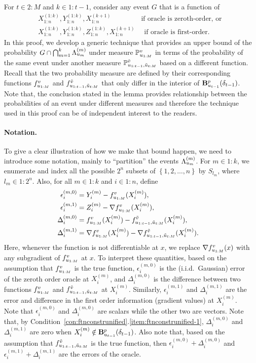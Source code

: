 For $t \in 2:M$ and $k \in 1:t-1$, consider any event $G$ that is a function of 
\begin{align*}
	&X_{1:n}^{(1:k)}, Y_{1:n}^{(1:k)}, X_{1:n}^{(k+1)} 
	\quad\quad\quad\quad \text{ if oracle is zeroth-order, or }\\
	&X_{1:n}^{(1:k)}, Y_{1:n}^{(1:k)}, Z_{1:n}^{(1:k)}, X_{1:n}^{(k+1)} 
	\quad \text{ if oracle is first-order.}
\end{align*}
In this proof, we develop a generic technique that provides an upper bound of the probability 
$G \cap \bigcap_{m=1}^{k} \Lambda_{u_{m}}^{({m})}$ under measure $\mathbb{P}_{u_{1:M}}^v$ in terms of 
the probability of the same event under another measure $\mathbb{P}_{u_{1:t-1}, \tilde u_{t:M}}^{\tilde v}$ based on a different function.
Recall that the two probability 
measure are defined by their corresponding functions $f_{u_{1:M}}^v$ and $f_{u_{1:t-1}, \tilde u_{t:M}}^{\tilde v}$ that only differ
in the interior of $\mathbf{B}^p_{u_{t-1}}({\delta_{t-1}})$.
Note that, the conclusion stated in the lemma provides relationship between the probabilities of 
an event under different measures and therefore the technique used in
this proof can be of independent interest to the readers. 

\paragraph{Notation.}
To give a clear illustration of how we make that bound happen, we need to introduce some notation, mainly 
to ``partition'' the events $\Lambda_{u_{m}}^{({m})}$. 
For $m \in 1:k$, we enumerate and index all the possible $2^n$ subsets of $\left\{1, 2, \ldots, n\right\}$
by $S_{l_m}$, where $l_m \in 1:2^n$. 
Also, for all $m \in 1:k$ and $i \in 1:n$, define 
\begin{align*}
	\epsilon_i^{(m,0)} &= Y_i^{(m)} - f_{u_{1:M}}^v(X_i^{(m)}), \\
	\epsilon_i^{(m,1)} &= Z_i^{(m)} - \nabla f_{u_{1:M}}^v(X_i^{(m)}),\\
	\Delta_i^{(m,0)} &= f_{u_{1:M}}^v(X_i^{(m)}) - f_{u_{1:t-1}, \tilde u_{t:M}}^{\tilde v}(X_i^{(m)}),\\
	\Delta_i^{(m,1)} &= \nabla f_{u_{1:M}}^v(X_i^{(m)}) - \nabla f_{u_{1:t-1}, \tilde u_{t:M}}^{\tilde v}(X_i^{(m)}).
\end{align*}
Here, whenever the function is not differentiable at $x$, 
we replace $\nabla f_{u_{1:M}}^v(x)$ with any subgradient of $f_{u_{1:M}}^v$ at $x$.
To interpret these quantities, based on the assumption that $f_{u_{1:M}}^v$ is the true function,
$\epsilon_i^{(m,0)}$ is the (i.i.d.\ Gaussian) error of the zeroth order oracle at $X_i^{(m)}$, and $\Delta_i^{(m,0)}$ is the difference between two functions $f_{u_{1:M}}^v$ and $f_{u_{1:t-1}, \tilde u_{t:M}}^{\tilde v}$ at $X_i^{(m)}$. Similarly, $\epsilon_i^{(m,1)}$ and $\Delta_i^{(m,1)}$ are the error and difference in the first order information (gradient values) at $X_i^{(m)}$. Note that $\epsilon_i^{(m,0)}$ and $\Delta_i^{(m,0)}$ are scalars while the other two are vectors.
Note that, by Condition~\ref{con:ftnconstrunified}.\ref{item:ftnconstrunified-1}, $\Delta_i^{(m,0)}$ and $\Delta_i^{(m,1)}$ are zero when $X_i^{(m)} \notin \mathbf{B}^p_{u_{t-1}}({\delta_{t-1}})$. Also note that, based on the assumption that $f_{u_{1:t-1}, \tilde u_{t:M}}^{\tilde v}$ is the true function, then $\epsilon_i^{(m,0)} + \Delta_i^{(m,0)}$ and $\epsilon_i^{(m,1)} + \Delta_i^{(m,1)}$ are the errors of the oracle.

